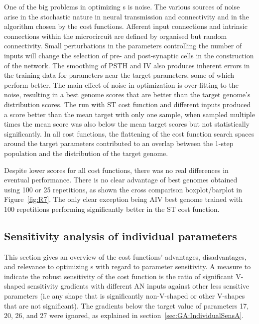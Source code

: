 
One of the big problems in optimizing {\BNN}s is noise.  The various
sources of noise arise in the stochastic nature in neural transmission and
connectivity and in the algorithm chosen by the cost functions. Afferent
input connections and intrinsic connections within the microcircuit are
defined by organised but random connectivity.  Small perturbations in the
parameters controlling the number of inputs will change the selection of
pre- and post-synaptic cells in the construction of the network.  The
smoothing of PSTH and IV also produces inherent errors in the training data
for parameters near the target parameters, some of which perform better.
The main effect of noise in optimization is over-fitting to the noise,
resulting in a best genome scores that are better than the target genome's
distribution scores.  The {\GA} run with ST cost function and different
inputs produced a score better than the mean target with only one sample,
when sampled multiple times the mean score was also below the mean target
scores but not statistically significantly.  In all cost functions, the
flattening of the cost function search spaces around the target parameters
contributed to an overlap between the 1-step population and the
distribution of the target genome.

\smallskip{}

Despite lower scores for all cost functions, there was no real differences
in eventual performance.  There is no clear advantage of best genomes
obtained using 100 or 25 repetitions, as shown the cross comparison
boxplot/barplot in Figure~\ref{fig:R7}. The only clear exception being AIV
best genome trained with 100 repetitions performing significantly better in
the ST cost function.


\subsection{Sensitivity analysis of individual parameters}

This section gives an overview of the cost functions' advantages,
disadvantages, and relevance to optimizing {\BNN}s with regard to parameter
sensitivity.  A measure to indicate the robust sensitivity of the cost
function is the ratio of significant V-shaped sensitivity gradients with
different AN inputs against other less sensitive parameters (i.e any shape
that is significantly non-V-shaped or other V-shapes that are not
significant). The gradients below the target value of parameters 17, 20,
26, and 27 were ignored, as explained in
section~\ref{sec:GA:IndividualSensA}.

